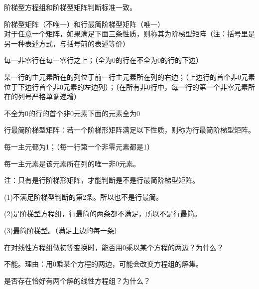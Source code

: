 \documentclass[a4paper]{report}
\begin{document}
\begin{tips}
阶梯型方程组和阶梯型矩阵判断标准一致。

阶梯型矩阵（不唯一）和行最简阶梯型矩阵（唯一）\\
对于任意一个矩阵，如果满足下面三条性质，则称其为\textcolor[rgb]{1.00,0.00,0.00}{阶梯型矩阵}（注：括号里是另一种表述方式，与括号前的表述等价）
\begin{asparaenum}[(1)]
\item 每一非零行在每一零行之上；（全为0的行在不全为0的行的下边）
\item 某一行的主元素所在的列位于前一行主元素所在列的右边；（上边行的首个非0元素位于下边行首个非0元素的左边列）；（在所有非0行中，每一行的第一个非零元素所在的列号严格单调递增）
\item 不全为0的行的首个非0元素下面的元素全为0
\end{asparaenum}
行最简阶梯型矩阵：若一个阶梯形矩阵满足以下性质，则称为\textcolor[rgb]{1.00,0.00,0.00}{行最简阶梯型矩阵}。
\begin{asparaenum}[(1)]
\item 每一主元都为1；（每一行第一个非零元素都是1）
\item 每一主元素是该元素所在列的唯一非0元素。
\end{asparaenum}
注：只有是行阶梯形矩阵，才能判断是不是行最简阶梯型矩阵。
\end{tips}

\begin{jie}
(1)不满足阶梯型判断的第2条。所以也不是行最简。

(2)是阶梯型方程组，行最简的两条都不满足，所以不是行最简。

(3)最简阶梯型。（满足上边的每一条）
\end{jie}


\EX 在对线性方程组做初等变换时，能否用0乘以某个方程的两边？为什么？

\begin{jie}
不能。理由：用0乘某个方程的两边，可能会改变方程组的解集。
\end{jie}

\EX 是否存在恰好有两个解的线性方程组？为什么？
\end{document}
